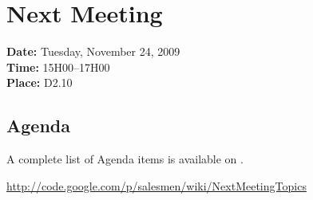 \documentclass[a4paper, 12pt]{article}
\begin{document}
	\section{Next Meeting}

		\textbf{Date:} Tuesday, November 24, 2009\\
		\textbf{Time:} 15H00--17H00\\
		\textbf{Place:} D2.10\\
	
		\subsection{Agenda}
A complete list of Agenda items is available on \cite{site1}.\\
	
	\begin{thebibliography}{99}
	
		
		\href{http://code.google.com/p/salesmen/wiki/NextMeetingTopics}{http://code.google.com/p/salesmen/wiki/NextMeetingTopics}
		

		

		
	\end{thebibliography}	
		
\end{document}
